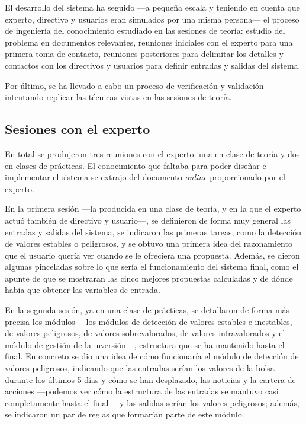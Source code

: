 \documentclass[a4paper, 11pt, titlepage]{article}
\begin{document}
    El desarrollo del sistema ha seguido ---a pequeña escala y teniendo en cuenta que experto, directivo y usuarios eran simulados por una misma persona--- el proceso de ingeniería del conocimiento estudiado en las sesiones de teoría: estudio del problema en documentos relevantes, reuniones iniciales con el experto para una primera toma de contacto, reuniones posteriores para delimitar los detalles y contactos con los directivos y usuarios para definir entradas y salidas del sistema.

    Por último, se ha llevado a cabo un proceso de verificación y validación intentando replicar las técnicas vistas en las sesiones de teoría.

    \subsection{Sesiones con el experto}

    En total se produjeron tres reuniones con el experto: una en clase de teoría y dos en clases de prácticas. El conocimiento que faltaba para poder diseñar e implementar el sistema se extrajo del documento \emph{online} proporcionado por el experto.

    En la primera sesión ---la producida en una clase de teoría, y en la que el experto actuó también de directivo y usuario---, se definieron de forma muy general las entradas y salidas del sistema, se indicaron las primeras tareas, como la detección de valores estables o peligrosos, y se obtuvo una primera idea del razonamiento que el usuario quería ver cuando se le ofreciera una propuesta. Además, se dieron algunas pinceladas sobre lo que sería el funcionamiento del sistema final, como el apunte de que se mostraran las cinco mejores propuestas calculadas y de dónde había que obtener las variables de entrada.

    En la segunda sesión, ya en una clase de prácticas, se detallaron de forma más precisa los módulos ---los módulos de detección de valores estables e inestables, de valores peligrosos, de valores sobrevalorados, de valores infravalorados y el módulo de gestión de la inversión---, estructura que se ha mantenido hasta el final. En concreto se dio una idea de cómo funcionaría el módulo de detección de valores peligrosos, indicando que las entradas serían los valores de la bolsa durante los últimos 5 días y cómo se han desplazado, las noticias y la cartera de acciones ---podemos ver cómo la estructura de las entradas se mantuvo casi completamente hasta el final--- y las salidas serían los valores peligrosos; además, se indicaron un par de reglas que formarían parte de este módulo.
\end{document}

